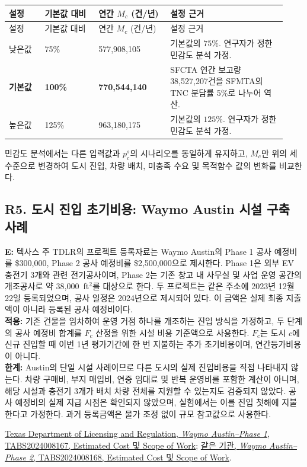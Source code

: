 \documentclass[10pt,a4paper]{article}
\begin{document}
\begingroup
\small
\setlength{\tabcolsep}{4pt}
\renewcommand{\arraystretch}{1.2}
\begin{longtable}{@{}
P{0.12\linewidth}
P{0.18\linewidth}
P{0.24\linewidth}
P{0.39\linewidth}
@{}}
\toprule
설정
& 기본값 대비
& 연간 $M_c$ \newline (건/년)
& 설정 근거 \\
\midrule
\endfirsthead
\toprule
설정
& 기본값 대비
& 연간 $M_c$ \newline (건/년)
& 설정 근거 \\
\midrule
\endhead
낮은값
& 75\%
& 577,908,105
& 기본값의 $75\%$.
연구자가 정한 민감도 분석 가정. \\
\addlinespace
\textbf{기본값}
& \textbf{100\%}
& \textbf{770,544,140}
& SFCTA 연간 보고량 38,527,207건을
SFMTA의 TNC 분담률 5\%로 나누어 역산. \\
\addlinespace
높은값
& 125\%
& 963,180,175
& 기본값의 $125\%$.
연구자가 정한 민감도 분석 가정. \\
\bottomrule
\end{longtable}
\endgroup

\noindent
민감도 분석에서는 다른 입력값과
$p_c^s$의 시나리오를 동일하게 유지하고,
$M_c$만 위의 세 수준으로 변경하여
도시 진입, 차량 배치, 미충족 수요 및
목적함수 값의 변화를 비교한다.

\subsection*{\hypertarget{rationale-R5}{R5. 도시 진입 초기비용: Waymo Austin 시설 구축 사례}}
\noindent
\textbf{E:}
텍사스 주 TDLR의 프로젝트 등록자료는 Waymo Austin의
Phase 1 공사 예정비를 \$300,000,
Phase 2 공사 예정비를 \$2,500,000으로 제시한다.
Phase 1은 외부 EV 충전기 3개와 관련 전기공사이며,
Phase 2는 기존 창고 내 사무실 및 사업 운영 공간의 개조공사로
약 38,000~ft$^2$를 대상으로 한다.
두 프로젝트는 같은 주소에 2023년 12월 22일 등록되었으며,
공사 일정은 2024년으로 제시되어 있다.
이 금액은 실제 최종 지출액이 아니라 등록된 공사 예정비이다. \\
\textbf{적용:}
기존 건물을 임차하여 운영 거점 하나를 개조하는 진입 방식을 가정하고,
두 단계의 공사 예정비 합계를 $F_c$ 산정을 위한 시설 비용 기준액으로 사용한다.
$F_c$는 도시 $c$에 신규 진입할 때 이번 1년 평가기간에
한 번 지불하는 추가 초기비용이며, 연간등가비용이 아니다. \\
\textbf{한계:}
Austin의 단일 시설 사례이므로 다른 도시의 실제 진입비용을 직접 나타내지 않는다.
차량 구매비, 부지 매입비, 연중 임대료 및 반복 운영비를 포함한 계산이 아니며,
해당 시설과 충전기 3개가 배치 차량 전체를 지원할 수 있는지도 검증되지 않았다.
공사 예정비의 실제 지급 시점은 확인되지 않았으며,
실험에서는 이를 진입 첫해에 지불한다고 가정한다.
과거 등록금액은 물가 조정 없이 규모 참고값으로 사용한다.
\medskip
\noindent
\par\href{https://www.tdlr.texas.gov/TABS/Search/Print/TABS2024008167}
{Texas Department of Licensing and Regulation,
\textit{Waymo Austin--Phase 1}, TABS2024008167,
Estimated Cost 및 Scope of Work};
\href{https://www.tdlr.texas.gov/TABS/Search/Print/TABS2024008168}
{같은 기관, \textit{Waymo Austin--Phase 2}, TABS2024008168,
Estimated Cost 및 Scope of Work}.
\medskip \\
\end{document}
